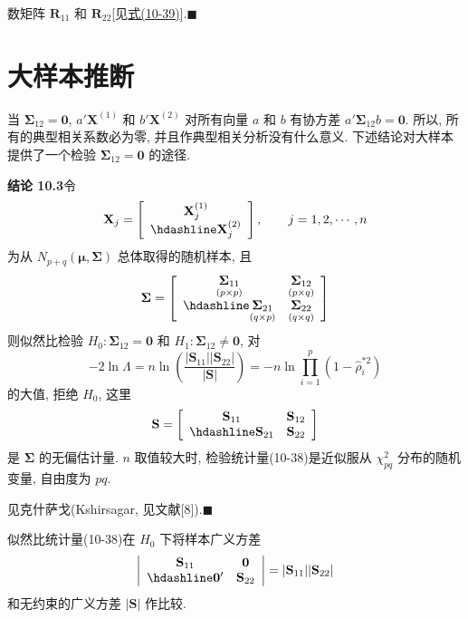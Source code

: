 
数矩阵 $\mathbf{R}_{11}$ 和 $\mathbf{R}_{22}$[见\hyperref[eq:10-39]{式(10-39)}].\hfill$\blacksquare$

\section{大样本推断}  %
\label{sec:10.6}

当 $\boldsymbol{\Sigma}_{12}=\mathbf{0}$, $a'\mathbf{X}^{(1)}$ 和 $b'\mathbf{X}^{(2)}$ 对所有向量 $a$ 和 $b$ 有协方差 $a'\boldsymbol{\Sigma}_{12}b=\mathbf{0}$. 所以, 所有的典型相关系数必为零, 并且作典型相关分析没有什么意义. 下述结论对大样本提供了一个检验 $\boldsymbol{\Sigma}_{12}=\mathbf{0}$ 的途径.

\noindent\textbf{结论 10.3}\quad 令
\[
\mathbf{X}_j=\left[\begin{array}{c}\mathbf{X}_j^{(1)}\\ \hdashline \mathbf{X}_j^{(2)}\end{array}\right],\qquad j=1,2,\cdots,n
\]
为从 $N_{p+q}(\boldsymbol{\mu},\boldsymbol{\Sigma})$ 总体取得的随机样本, 且
\[
\boldsymbol{\Sigma}=\left[\begin{array}{cc}\underset{(p\times p)}{\boldsymbol{\Sigma}_{11}}&\underset{(p\times q)}{\boldsymbol{\Sigma}_{12}}\\ \hdashline \underset{(q\times p)}{\boldsymbol{\Sigma}_{21}}&\underset{(q\times q)}{\boldsymbol{\Sigma}_{22}}\end{array}\right]
\]
则似然比检验 $H_0:\boldsymbol{\Sigma}_{12}=\mathbf{0}$ 和 $H_1:\boldsymbol{\Sigma}_{12}\ne\mathbf{0}$, 对
\label{eq:10-38}
\begin{equation}
-2\ln\Lambda=n\ln\left(\frac{|\mathbf{S}_{11}||\mathbf{S}_{22}|}{|\mathbf{S}|}\right)=-n\ln\prod_{i=1}^{p}(1-\hat{\rho}_i^{*2})
\tag{10-38}
\end{equation}
的大值, 拒绝 $H_0$, 这里
\[
\mathbf{S}=\left[\begin{array}{cc}\mathbf{S}_{11}&\mathbf{S}_{12}\\ \hdashline \mathbf{S}_{21}&\mathbf{S}_{22}\end{array}\right]
\]
是 $\boldsymbol{\Sigma}$ 的无偏估计量. $n$ 取值较大时, 检验统计量(10-38)是近似服从 $\chi^2_{pq}$ 分布的随机变量, 自由度为 $pq$.

\noindent{}\quad 见克什萨戈(Kshirsagar, 见文献[8]).\hfill$\blacksquare$

似然比统计量(10-38)在 $H_0$ 下将样本广义方差
\[
\left|\begin{array}{cc}\mathbf{S}_{11}&\mathbf{0}\\ \hdashline \mathbf{0}'&\mathbf{S}_{22}\end{array}\right|=|\mathbf{S}_{11}||\mathbf{S}_{22}|
\]
和无约束的广义方差 $|\mathbf{S}|$ 作比较.

